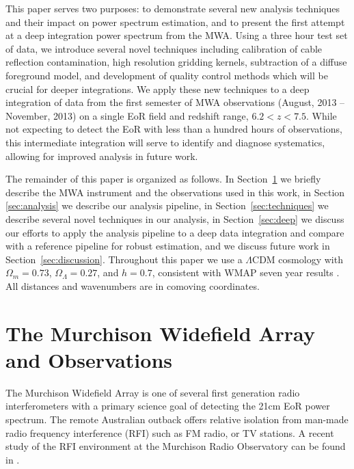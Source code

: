 \documentclass[iop]{emulateapj}
\begin{document}
This paper serves two purposes: to demonstrate several new analysis techniques and their 
impact on power spectrum estimation, and to present the first attempt at a deep integration 
power spectrum from the MWA. Using a three hour test set of data, we introduce several 
novel techniques including calibration of cable reflection contamination, high resolution 
gridding kernels, subtraction of a diffuse foreground model, and development of quality 
control methods which will be crucial for deeper integrations. We apply these new 
techniques to a deep integration of data from the first semester of MWA observations 
(August, 2013 -- November, 2013) on a single EoR field and redshift range, $6.2<z<7.5$. 
While not expecting to detect the EoR with less than a hundred hours of observations, this 
intermediate integration will serve to identify and diagnose systematics, allowing for 
improved analysis in future work.

The remainder of this paper is organized as follows. In Section~\ref{sec:MWA} we briefly 
describe the MWA instrument and the observations used in this work, in Section~
\ref{sec:analysis} we describe our analysis pipeline, in Section~\ref{sec:techniques} we 
describe several novel techniques in our analysis, in Section~\ref{sec:deep} we discuss our 
efforts to apply the analysis pipeline to a deep data integration and compare with a reference pipeline for robust estimation, and we discuss future work 
in Section~\ref{sec:discussion}. Throughout this paper we use a $\Lambda$CDM 
cosmology with $\Omega_m=0.73$, $\Omega_\Lambda=0.27$, and $h = 0.7$, consistent 
with WMAP seven year results \citep{Komatsu:2011}. All distances and wavenumbers are in 
comoving coordinates.

\section{The Murchison Widefield Array and Observations}\label{sec:MWA}
The Murchison Widefield Array is one of several first generation radio interferometers with 
a primary science goal of detecting the 21cm EoR power spectrum. The remote Australian 
outback offers relative isolation from man-made radio frequency interference (RFI) such as 
FM radio, or TV stations. A recent study of the RFI environment at the Murchison Radio 
Observatory can be found in \citealt{Offringa:2015}.
\end{document}
